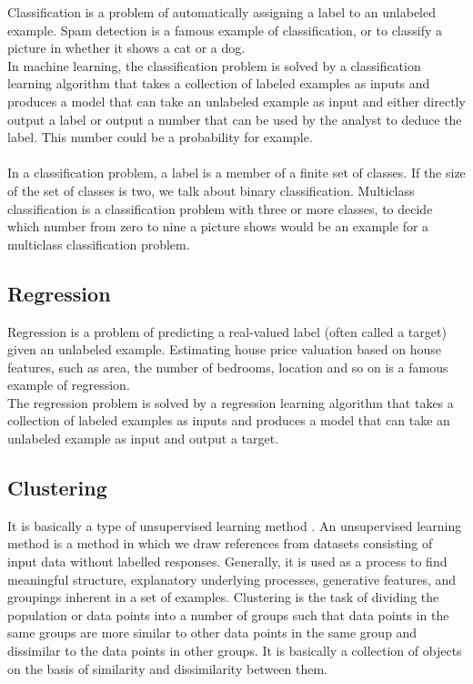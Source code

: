 Classification is a problem of automatically assigning a label to an unlabeled example. Spam detection is a famous example of classification, or to classify a picture in whether it shows a cat or a dog. \\
In machine learning, the classification problem is solved by a classification learning algorithm that takes a collection of labeled examples as inputs and produces a model that can take an unlabeled example as input and either directly output a label or output a number that can be used by the analyst to deduce the label. This number could be a probability for example. \\
\\
In a classification problem, a label is a member of a finite set of classes. If the size of the set of classes is two, we talk about binary classification. Multiclass classification is a classification problem with three or more classes, to decide which number from zero to nine a picture shows would be an example for a multiclass classification problem.  \cite{thehundrerpageMLbook}


\subsection{Regression}  

Regression is a problem of predicting a real-valued label (often called a target) given an unlabeled example. Estimating house price valuation based on house features, such as area, the number of bedrooms, location and so on is a famous example of regression. \\
The regression problem is solved by a regression learning algorithm that takes a collection of labeled examples as inputs and produces a model that can take an unlabeled example as input and output a target.


\subsection{Clustering}
It is basically a type of unsupervised learning method . An unsupervised learning method is a method in which we draw references from datasets consisting of input data without labelled responses. Generally, it is used as a process to find meaningful structure, explanatory underlying processes, generative features, and groupings inherent in a set of examples.
Clustering is the task of dividing the population or data points into a number of groups such that data points in the same groups are more similar to other data points in the same group and dissimilar to the data points in other groups. It is basically a collection of objects on the basis of similarity and dissimilarity between them. 
\cite{thehundrerpageMLbook}

